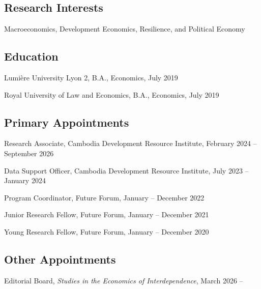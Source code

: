 \documentclass[10pt,a4paper]{article}
\begin{document}
\subsection*{Research Interests}	

Macroeconomics, Development Economics, Resilience, and Political Economy

\subsection*{Education}
	
	Lumière University Lyon 2, B.A., Economics, July 2019
	
	Royal University of Law and Economics, B.A., Economics, July 2019 
	

\subsection*{Primary Appointments}	

		Research Associate, Cambodia Development Resource Institute,  February 2024 -- September 2026
		
		Data Support Officer, Cambodia Development Resource Institute, July 2023 -- January 2024
		
		Program Coordinator, Future Forum, January -- December 2022
		
		Junior Research Fellow, Future Forum, January -- December 2021
		
		Young Research Fellow, Future Forum, January -- December 2020

\subsection*{Other Appointments}
	
	Editorial Board, \textit{Studies in the Economics of Interdependence}, March 2026 --
	
\end{document}
